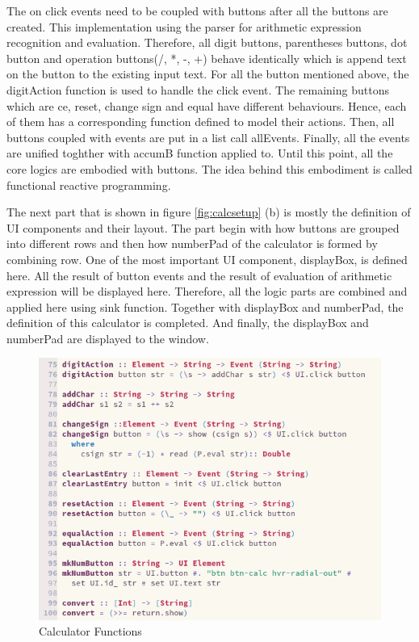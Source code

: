 \documentclass{article}
\begin{document}
\begin{normalsize}
  The on click events need to be coupled with buttons after all the buttons are created. This implementation using the parser for arithmetic expression recognition and evaluation. Therefore, all digit buttons,
  parentheses buttons, dot button and operation buttons(/, *, -, +) behave identically which is append text on the button to the existing input text. For all the button mentioned above, the digitAction function is used to handle the click event. The remaining buttons which are ce, reset, change sign and equal have different behaviours. Hence, each of them has a corresponding function defined to model their actions. Then, all buttons coupled with events are put in a list call allEvents. Finally, all the events are unified toghther with accumB function applied to. Until this point, all the core logics are embodied with buttons. The idea behind this embodiment is called functional reactive programming.

  The next part that is shown in figure \ref{fig:calcsetup} (b) is mostly the
  definition of UI components and their layout. The part begin with how buttons are grouped into different rows and then how numberPad of the calculator is formed by combining row. One of the most important UI component, displayBox, is defined here. All the result of button events and the result of evaluation of arithmetic expression will be displayed here. Therefore, all the logic parts are combined and applied here using sink function. Together with displayBox and numberPad, the definition of this calculator is completed. And finally, the displayBox and numberPad are displayed to the window.
  
  \begin{figure}[H]
    \centering
    \centerline{\includegraphics[scale=0.8]{calcfuncs}}
    \caption{Calculator Functions}
    \label{fig:calcfuncs}
  \end{figure}


\end{normalsize}
\end{document}
